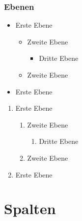 \begin{frame}
	\frametitle{Ebenen}
	\begin{itemize}
		\item Erste Ebene
			\begin{itemize}
				\item Zweite Ebene
				\begin{itemize}
					\item Dritte Ebene
				\end{itemize}
				\item Zweite Ebene
			\end{itemize}
		\item Erste Ebene
	\end{itemize}
	\begin{enumerate}	
		\item Erste Ebene
			\begin{enumerate}
				\item Zweite Ebene
				\begin{enumerate}
					\item Dritte Ebene
				\end{enumerate}
				\item Zweite Ebene
			\end{enumerate}
		\item Erste Ebene
	\end{enumerate}
\end{frame}

\section{Spalten} %

